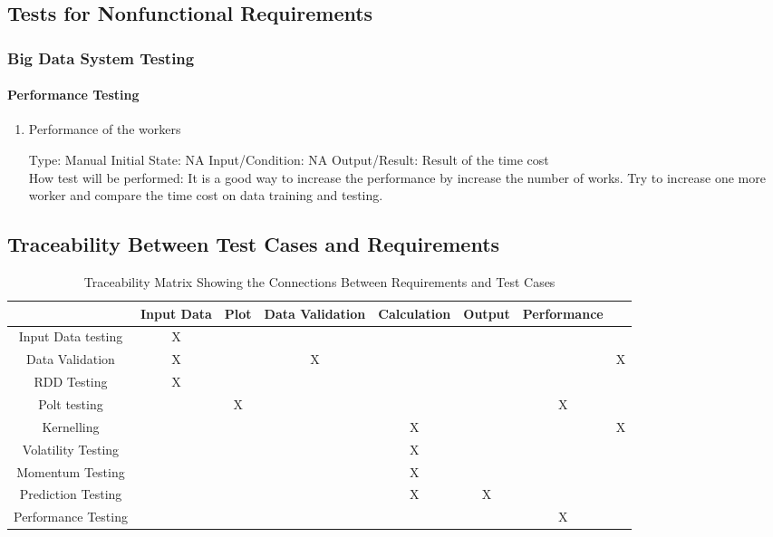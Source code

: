 \documentclass[12pt, titlepage]{article}
\begin{document}
\subsection{Tests for Nonfunctional Requirements}

\subsubsection{Big Data System Testing}
\paragraph{ Performance Testing}

\begin{enumerate}

\item{Performance of the workers\\}

Type: Manual
Initial State: NA
Input/Condition: NA
Output/Result: Result of the time cost\\
How test will be performed: It is a good way to increase the performance by increase the number of works. Try to increase one more worker and compare the time cost on data training and testing.


\end{enumerate}


\subsection{Traceability Between Test Cases and Requirements}

\begin{table}[h!]
\centering
\begin{tabular}{|c|c|c|c|c|c|c|c|}
\hline
& Input Data & Plot & Data Validation & Calculation & Output &Performance\\
\hline
Input Data testing &X & & & & & \\ \hline
Data Validation &X & &X & & & &X \\ \hline
RDD Testing &X & & & & & & \\ \hline
Polt testing & &X & & & &X \\ \hline
Kernelling & & & & X& & &X \\ \hline
Volatility Testing & & & &X & & & \\ \hline 
Momentum Testing & & & &X & & & \\ \hline 
Prediction Testing & & & &X &X & & \\ \hline 
Performance Testing & & & & & & X& \\ \hline 

\end{tabular}
\caption{Traceability Matrix Showing the Connections Between Requirements and Test Cases}
\label{Table:R_trace}
\end{table}
\end{document}
